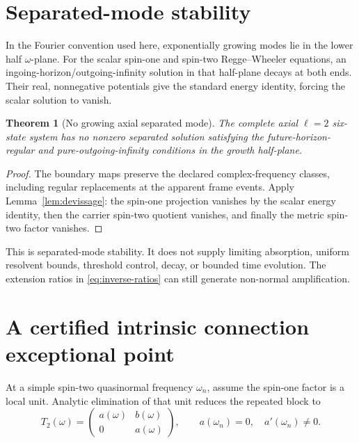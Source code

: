 \documentclass[11pt]{article}
\newtheorem{theorem}{Theorem}[section]
\theoremstyle{definition}
\theoremstyle{remark}
\begin{document}
\section{Separated-mode stability}

In the Fourier convention used here, exponentially growing modes lie in the
lower half \(\omega\)-plane.  For the scalar spin-one and spin-two
Regge--Wheeler equations, an ingoing-horizon/outgoing-infinity solution in
that half-plane decays at both ends.  Their real, nonnegative potentials give
the standard energy identity, forcing the scalar solution to vanish.

\begin{theorem}[No growing axial separated mode]
\label{thm:no-growth}
The complete axial \(\ell=2\) six-state system has no nonzero separated
solution satisfying the future-horizon-regular and pure-outgoing-infinity
conditions in the growth half-plane.
\end{theorem}

\begin{proof}
The boundary maps preserve the declared complex-frequency classes, including
regular replacements at the apparent frame events.  Apply
Lemma~\ref{lem:devissage}: the spin-one projection vanishes by the scalar
energy identity, then the carrier spin-two quotient vanishes, and finally the
metric spin-two factor vanishes.
\end{proof}

This is separated-mode stability.  It does not supply limiting absorption,
uniform resolvent bounds, threshold control, decay, or bounded time evolution.
The extension ratios in \eqref{eq:inverse-ratios} can still generate
non-normal amplification.

\section{A certified intrinsic connection exceptional point}
\label{sec:ep2}

At a simple spin-two quasinormal frequency \(\omega_n\), assume the spin-one
factor is a local unit.  Analytic elimination of that unit reduces the
repeated block to
\begin{equation}
\label{eq:local-block}
T_2(\omega)=
\begin{pmatrix}
a(\omega)&b(\omega)\\
0&a(\omega)
\end{pmatrix},
\qquad
a(\omega_n)=0,\quad a'(\omega_n)\neq0.
\end{equation}
\end{document}
